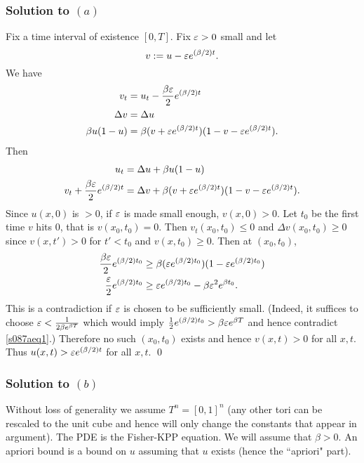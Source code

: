 \subsubsection*{Solution to $(a)$}
Fix a time interval of existence $[0, T]$.
Fix $\varepsilon > 0$ small and let
$$v := u - \varepsilon e^{(\beta/2)t}.$$
We have
\begin{align*}
v_{t} &= u_{t} - \frac{\beta \varepsilon}{2}e^{(\beta/2)t}\\
\Delta v &= \Delta u\\
\beta u(1 - u) &= \beta (v + \varepsilon e^{(\beta/2)t})(1 - v - \varepsilon e^{(\beta/2)t}).
\end{align*}
Then
\begin{align*}
u_{t} &= \Delta u + \beta u(1 - u)\\
v_{t} + \frac{\beta \varepsilon}{2}e^{(\beta/2)t} &= \Delta v + \beta (v + \varepsilon e^{(\beta/2)t})(1 - v - \varepsilon e^{(\beta/2)t}).
\end{align*}
Since $u(x, 0)$ is $ > 0$, if $\varepsilon$ is made small enough, $v(x , 0) > 0$. Let
$t_{0}$ be the first time $v$ hits $0$, that is $v(x_{0}, t_{0}) = 0$.
Then $v_{t}(x_{0}, t_{0}) \leq 0$ and $\Delta v(x_{0}, t_{0}) \geq 0$
since $v(x, t') > 0$ for $t' < t_{0}$ and $v(x, t_{0}) \geq 0$. Then at $(x_{0}, t_{0})$,
\begin{align}\label{s087aeq1}
\frac{\beta\varepsilon}{2}e^{(\beta/2)t_{0}} & \geq \beta(\varepsilon e^{(\beta/2)t_{0}})(1 - \varepsilon e^{(\beta/2)t_{0}})\nonumber\\
\frac{\varepsilon}{2}e^{(\beta/2)t_{0}} & \geq \varepsilon e^{(\beta/2)t_{0}} - \beta \varepsilon^{2}e^{\beta t_{0}}.
\end{align}
This is a contradiction if $\varepsilon$ is chosen to be sufficiently small. (Indeed, it suffices to choose
$\varepsilon < \frac{1}{2\beta e^{\beta T}}$ which would imply $\frac{1}{2}e^{(\beta/2)t_{0}} > \beta \varepsilon e^{\beta T}$
and hence contradict \eqref{s087aeq1}.) Therefore no such $(x_{0}, t_{0})$
exists and hence $v(x, t) > 0$ for all $x, t$. Thus $u(x, t) > \varepsilon e^{(\beta/2)t}$ for all $x, t$.
\hfill\qed

\subsubsection*{Solution to $(b)$}
Without loss of generality we assume $T^{n} = [0, 1]^{n}$ (any other tori can be rescaled to the unit cube and hence will only change the constants
that appear in argument). The PDE is the Fisher-KPP equation. We will assume that $\beta > 0$. An apriori bound is a bound on $u$ assuming that $u$ exists (hence
the ``apriori" part).

